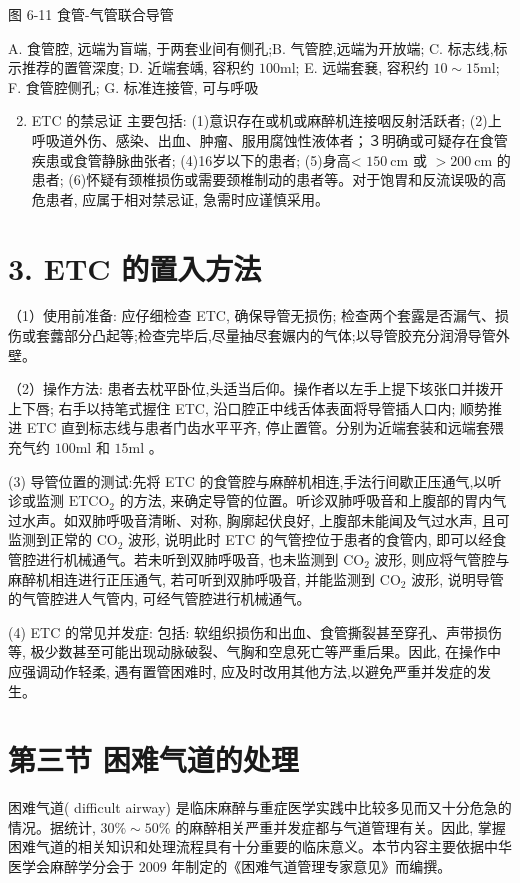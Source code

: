 \documentclass[10pt]{article}
\begin{document}
图 6-11 食管-气管联合导管

A. 食管腔, 远端为盲端, 于两套业间有侧孔;B. 气管腔,远端为开放端; C. 标志线,标示推荐的置管深度; D. 近端套竬, 容积约 $100 \mathrm{ml}$; E. 远端套㐮, 容积约 $10 \sim 15 \mathrm{ml}$; F. 食管腔侧孔; G. 标准连接管, 可与呼吸

\begin{enumerate}
  \setcounter{enumi}{1}
  \item ETC 的禁忌证 主要包括: (1)意识存在或机或麻醉机连接咽反射活跃者; (2)上呼吸道外伤、感染、出血、肿瘤、服用腐蚀性液体者；３明确或可疑存在食管疾患或食管静脉曲张者; (4)16岁以下的患者; (5)身高< $150 \mathrm{~cm}$ 或 $>200 \mathrm{~cm}$ 的患者; (6)怀疑有颈椎损伤或需要颈椎制动的患者等。对于饱胃和反流误吸的高危患者, 应属于相对禁忌证, 急需时应谨慎采用。
\end{enumerate}

\section*{3. ETC 的置入方法}
（1）使用前准备: 应仔细检查 ETC, 确保导管无损伤; 检查两个套露是否漏气、损伤或套虂部分凸起等;检查完毕后,尽量抽尽套㜊内的气体;以导管胶充分润滑导管外壁。

（2）操作方法: 患者去枕平卧位,头适当后仰。操作者以左手上提下垓张口并拨开上下唇; 右手以持笔式握住 ETC, 沿口腔正中线舌体表面将导管插人口内; 顺势推进 ETC 直到标志线与患者门齿水平平齐, 停止置管。分别为近端套装和远端套㱬充气约 $100 \mathrm{ml}$ 和 $15 \mathrm{ml}$ 。

(3) 导管位置的测试:先将 ETC 的食管腔与麻醉机相连,手法行间歇正压通气,以听诊或监测 $\mathrm{ETCO}_{2}$ 的方法, 来确定导管的位置。听诊双肺呼吸音和上腹部的胃内气过水声。如双肺呼吸音清晰、对称, 胸廓起伏良好, 上腹部未能闻及气过水声, 且可监测到正常的 $\mathrm{CO}_{2}$ 波形, 说明此时 ETC 的气管控位于患者的食管内, 即可以经食管腔进行机械通气。若未听到双肺呼吸音, 也未监测到 $\mathrm{CO}_{2}$ 波形, 则应将气管腔与麻醉机相连进行正压通气, 若可听到双肺呼吸音, 并能监测到 $\mathrm{CO}_{2}$ 波形, 说明导管的气管腔进人气管内, 可经气管腔进行机械通气。

(4) ETC 的常见并发症: 包括: 软组织损伤和出血、食管撕裂甚至穿孔、声带损伤等, 极少数甚至可能出现动脉破裂、气胸和空息死亡等严重后果。因此, 在操作中应强调动作轻柔, 遇有置管困难时, 应及时改用其他方法,以避免严重并发症的发生。

\section*{第三节 困难气道的处理}
困难气道( difficult airway) 是临床麻醉与重症医学实践中比较多见而又十分危急的情况。据统计, $30 \% \sim 50 \%$ 的麻醉相关严重并发症都与气道管理有关。因此, 掌握困难气道的相关知识和处理流程具有十分重要的临床意义。本节内容主要依据中华医学会麻醉学分会于 2009 年制定的《困难气道管理专家意见》而编撰。
\end{document}
